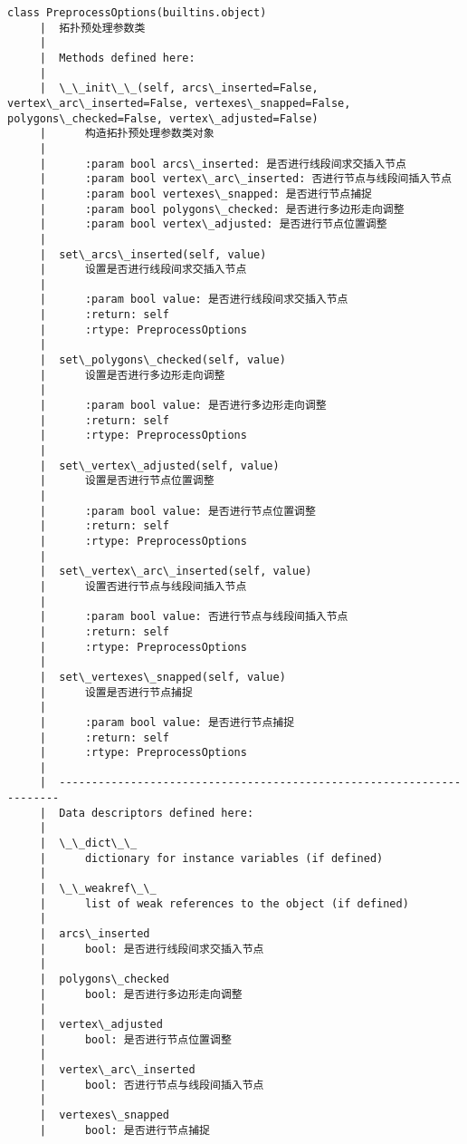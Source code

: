 \documentclass[11pt]{article}
\begin{document}
\begin{Verbatim}[commandchars=\\\{\}]
    class PreprocessOptions(builtins.object)
     |  拓扑预处理参数类
     |  
     |  Methods defined here:
     |  
     |  \_\_init\_\_(self, arcs\_inserted=False, vertex\_arc\_inserted=False, vertexes\_snapped=False, polygons\_checked=False, vertex\_adjusted=False)
     |      构造拓扑预处理参数类对象
     |      
     |      :param bool arcs\_inserted: 是否进行线段间求交插入节点
     |      :param bool vertex\_arc\_inserted: 否进行节点与线段间插入节点
     |      :param bool vertexes\_snapped: 是否进行节点捕捉
     |      :param bool polygons\_checked: 是否进行多边形走向调整
     |      :param bool vertex\_adjusted: 是否进行节点位置调整
     |  
     |  set\_arcs\_inserted(self, value)
     |      设置是否进行线段间求交插入节点
     |      
     |      :param bool value: 是否进行线段间求交插入节点
     |      :return: self
     |      :rtype: PreprocessOptions
     |  
     |  set\_polygons\_checked(self, value)
     |      设置是否进行多边形走向调整
     |      
     |      :param bool value: 是否进行多边形走向调整
     |      :return: self
     |      :rtype: PreprocessOptions
     |  
     |  set\_vertex\_adjusted(self, value)
     |      设置是否进行节点位置调整
     |      
     |      :param bool value: 是否进行节点位置调整
     |      :return: self
     |      :rtype: PreprocessOptions
     |  
     |  set\_vertex\_arc\_inserted(self, value)
     |      设置否进行节点与线段间插入节点
     |      
     |      :param bool value: 否进行节点与线段间插入节点
     |      :return: self
     |      :rtype: PreprocessOptions
     |  
     |  set\_vertexes\_snapped(self, value)
     |      设置是否进行节点捕捉
     |      
     |      :param bool value: 是否进行节点捕捉
     |      :return: self
     |      :rtype: PreprocessOptions
     |  
     |  ----------------------------------------------------------------------
     |  Data descriptors defined here:
     |  
     |  \_\_dict\_\_
     |      dictionary for instance variables (if defined)
     |  
     |  \_\_weakref\_\_
     |      list of weak references to the object (if defined)
     |  
     |  arcs\_inserted
     |      bool: 是否进行线段间求交插入节点
     |  
     |  polygons\_checked
     |      bool: 是否进行多边形走向调整
     |  
     |  vertex\_adjusted
     |      bool: 是否进行节点位置调整
     |  
     |  vertex\_arc\_inserted
     |      bool: 否进行节点与线段间插入节点
     |  
     |  vertexes\_snapped
     |      bool: 是否进行节点捕捉
    

\end{Verbatim}
\end{document}
